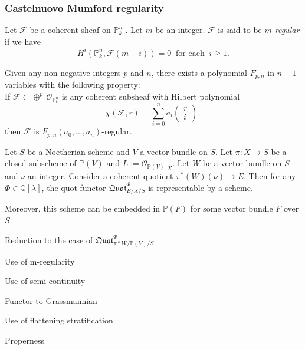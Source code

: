\documentclass[ignorenonframetext,t]{beamer}
\newcommand{\sF}{{\mathcal F}}
\newcommand{\sO}{{\mathcal O}}
\renewcommand{\P}{{\mathbb P}}
\newcommand{\Q}{{\mathbb Q}}
\theoremstyle{definition}
\begin{document}
\begin{frame}
	\frametitle{Castelnuovo Mumford regularity}
	
	\begin{definition}
		Let $\sF$ be a coherent sheaf on $\P_k^n$ . Let $m$ be an integer. $\sF$ is said to be \textit{$m$-regular} if we have
		\[H^i(\P^n_k,\sF(m-i))=0 \;\;\text{for each}\;\; i\geq 1.\]
	\end{definition}
	
	\begin{theorem}[Mumford]
		Given any non-negative integers $p$ and $n$, there exists a polynomial $F_{p,n}$ in $n+1$-variables with the following property:\\
		If $\sF\subset \oplus^p\, \sO_{\P^n_k}$ is any coherent subsheaf  with Hilbert polynomial 
		\[\chi(\sF,r)=\overset{n}{\underset{i=0}{\sum}} a_i 
		\begin{pmatrix}
		r\\
		i	
		\end{pmatrix},\]
		then $\sF$ is $F_{p,n}(a_0,\ldots,a_n)$-regular.
	\end{theorem}
\end{frame}



\begin{frame}
	\begin{theorem}
		Let $S$ be a Noetherian scheme and $V$ a vector bundle on $S$. Let $\pi: X\rightarrow S$ be a closed subscheme of $\P(V)$ and $L:=\sO_{\P(V)}|_X$. Let $W$ be a vector bundle on $S$ and $\nu$ an integer. Consider a coherent quotient $\pi^*(W)(\nu)\rightarrow E$. Then for any $\Phi\in \Q[\lambda]$, the quot functor $\mathfrak{Quot}^{\Phi}_{E/X/S}$ is representable by a scheme.
		
		Moreover, this scheme can be embedded in $\P(F)$ for some vector bundle $F$ over $S$.
		\end{theorem}
		
\end{frame}

\begin{frame}
	Reduction to the case of $\mathfrak{Quot}^{\Phi}_{\pi*W/\P(V)/S}$
\end{frame}

\begin{frame}
	Use of m-regularity
\end{frame}

\begin{frame}
	Use of semi-continuity
\end{frame}


\begin{frame}
	Functor to Grassmannian
\end{frame}

\begin{frame}
	Use of flattening stratification
\end{frame}

\begin{frame}
	Properness
\end{frame}



\end{document}
